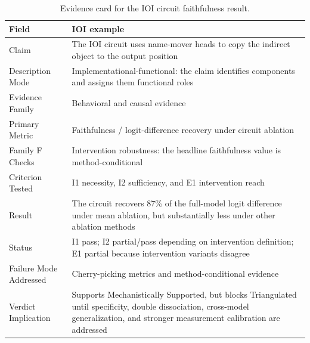 \documentclass[10pt]{article}
\begin{document}
\begin{table}[H]
\centering
\small
\caption{Evidence card for the IOI circuit faithfulness result.}
\renewcommand{\arraystretch}{1.2}
\begin{tabular}{@{}lp{10cm}@{}}
\toprule
\textbf{Field} & \textbf{IOI example} \\
\midrule
Claim & The IOI circuit uses name-mover heads to copy the indirect object to the output position \\
\midrule
Description Mode & Implementational-functional: the claim identifies components and assigns them functional roles \\
\midrule
Evidence Family & Behavioral and causal evidence \\
\midrule
Primary Metric & Faithfulness / logit-difference recovery under circuit ablation \\
\midrule
Family F Checks & Intervention robustness: the headline faithfulness value is method-conditional \\
\midrule
Criterion Tested & I1 necessity, I2 sufficiency, and E1 intervention reach \\
\midrule
Result & The circuit recovers 87\% of the full-model logit difference under mean ablation, but substantially less under other ablation methods \\
\midrule
Status & I1 pass; I2 partial/pass depending on intervention definition; E1 partial because intervention variants disagree \\
\midrule
Failure Mode Addressed & Cherry-picking metrics and method-conditional evidence \\
\midrule
Verdict Implication & Supports Mechanistically Supported, but blocks Triangulated until specificity, double dissociation, cross-model generalization, and stronger measurement calibration are addressed \\
\bottomrule
\end{tabular}
\label{tabevidencecardioi}
\end{table}
\end{document}
